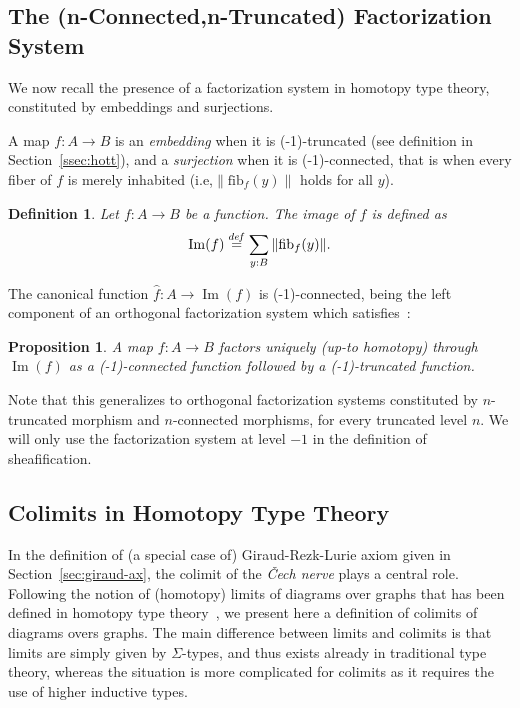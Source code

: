 \documentclass[conference]{IEEEtran}
\newtheorem{prop}[thm]{Proposition}
\newtheorem{defi}[thm]{Definition}
\newcommand \defeq {\overset{de\hspace{-0.2ex}f}{=}}
\newcommand{\ie}{i.e,\xspace}
\DeclareMathOperator{\im}{Im}
\newcommand \fib[2] {\mathrm{fib}_{#1}(#2)}
\begin{document}
\subsection{The (n-Connected,n-Truncated) Factorization System}
\label{sec:epi-mono-fact}

We now recall the presence of a factorization system in homotopy type
theory, constituted by embeddings and surjections.

A map $f:A\to B$ is an \emph{embedding} when it is (-1)-truncated
(see definition in Section~\ref{ssec:hott}), and a \emph{surjection}
when it is (-1)-connected, that is when every fiber of $f$ is merely
inhabited (\ie $\|\fib f y\|$ holds for all $y$).

\begin{defi}
  Let $f:A\to B$ be a function. The {\em image} of $f$ is defined as 
  $$\im(f) \defeq \sum_{y:B} \|\fib f y\|.$$
\end{defi}

The canonical function $\hat f : A \to \im(f)$ is (-1)-connected,
being the left component of an orthogonal factorization system which
satisfies~\cite[Lemma 7.6.4]{hottbook}:
\begin{prop}
  A map $f:A\to B$ factors uniquely (up-to homotopy) through
  $\im(f)$ as a (-1)-connected function followed by a (-1)-truncated
  function.
\end{prop}

Note that this generalizes to orthogonal factorization systems
constituted by $n$-truncated morphism and $n$-connected morphisms, for
every truncated level $n$. We will only use the factorization system
at level  $-1$ in the definition of sheafification.

\subsection{Colimits in Homotopy Type Theory }
\label{sec:colim-homot-type}

In the definition of (a special case of) Giraud-Rezk-Lurie axiom given in
Section~\ref{sec:giraud-ax}, the colimit of the {\em \v{C}ech nerve}
plays a central role.
% 
Following the notion of (homotopy) limits of diagrams over graphs that
has been defined in homotopy type theory~\cite{lumsdaine}, we present
here a definition of colimits of diagrams overs graphs. 
%
The main difference between limits and colimits is that limits are
simply given by $\Sigma$-types, and thus exists already in traditional
type theory, whereas the situation is more complicated for colimits as
it requires the use of higher inductive types.
\end{document}
